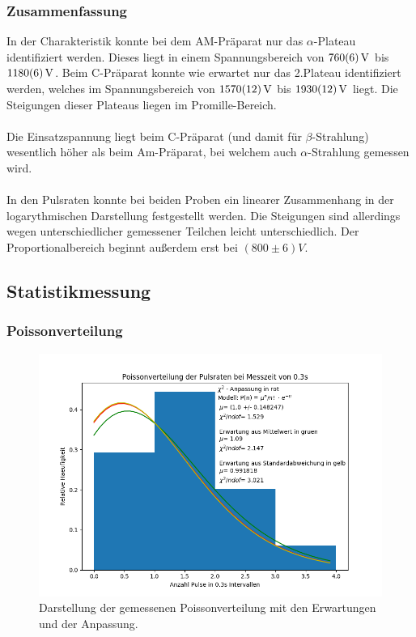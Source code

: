 \documentclass[12pt,a4paper]{article}
\begin{document}
\subsubsection{Zusammenfassung}
In der Charakteristik konnte bei dem AM-Präparat nur das $\alpha$-Plateau identifiziert werden. Dieses liegt in einem Spannungsbereich von $\SI{760\pm 6}{V}$ bis $\SI{1180\pm 6}{V}$. Beim C-Präparat konnte wie erwartet nur das 2.Plateau identifiziert werden, welches im Spannungsbereich von $\SI{1570\pm 12}{V}$ bis $\SI{1930\pm 12}{V}$ liegt. Die Steigungen dieser Plateaus liegen im Promille-Bereich.\\
\\
Die Einsatzspannung liegt beim C-Präparat (und damit für $\beta$-Strahlung) wesentlich höher als beim Am-Präparat, bei welchem auch $\alpha$-Strahlung gemessen wird.\\
\\
In den Pulsraten konnte bei beiden Proben ein linearer Zusammenhang in der logarythmischen Darstellung festgestellt werden. Die Steigungen sind allerdings wegen unterschiedlicher gemessener Teilchen leicht unterschiedlich. Der Proportionalbereich beginnt außerdem erst bei $(800\pm6)V$.
\newpage


\subsection{Statistikmessung}

\subsubsection{Poissonverteilung}
\begin{figure}
\centering
\includegraphics[scale=0.8]{Bilder/poisson.PNG}
\caption{Darstellung der gemessenen Poissonverteilung mit den Erwartungen und der Anpassung.}
\label{fig:Poisson}
\end{figure}
\end{document}
